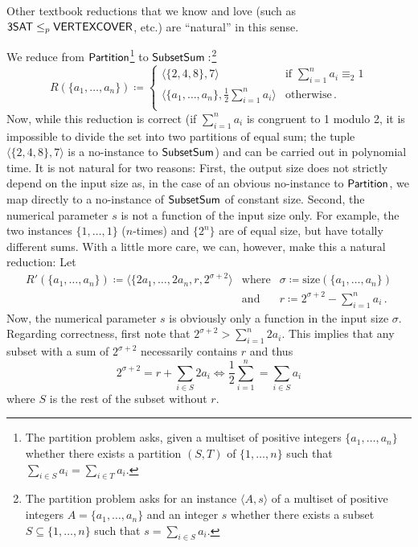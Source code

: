 \documentclass[11pt]{article}
\begin{document}
	Other textbook reductions that we know and love (such as $\mathsf{3SAT} \leq_p \mathsf{VERTEXCOVER}$, etc.) are ``natural'' in this sense.
%
%
\begin{example}
  We reduce from
  $\mathsf{Partition}$\footnote{The partition problem asks, given a multiset
  of positive integers $\{a_1, \dots, a_n\}$ whether there exists a partition
  $(S,T)$ of $\{1, \dots, n\}$ such that
  $\sum_{i \in S} a_i = \sum_{i \in T} a_i$.}
  to
  $\mathsf{SubsetSum}:$\footnote{The partition problem asks for an instance
  $\langle A, s \rangle$ of a multiset of positive integers
  $A = \{a_1, \dots, a_n\}$ and an integer $s$ whether there exists a subset
  $S \subseteq \{1, \dots, n\}$ such that
  $s = \sum_{i \in S} a_i$.}
  \[
    R(\{a_1, \dots, a_n\}) \coloneqq
    \left\{
      \begin{array}{ll}
        \langle \{2, 4, 8\}, 7 \rangle
          & \textrm{if } \sum_{i=1}^n a_i \equiv_2 1 \\
        \langle \{a_1, \dots, a_n\}, \frac 1 2 \sum_{i=1}^n a_i \rangle
          & \textrm{otherwise} \,. \\
      \end{array}
    \right.
  \]
  Now, while this reduction is correct (if $\sum_{i=1}^n a_i$ is congruent to 1
  modulo 2, it is impossible to divide the set into two partitions of equal sum;
  the tuple $\langle \{2, 4, 8\}, 7 \rangle$ is a no-instance to
  $\mathsf{SubsetSum}$) and can be carried out in polynomial time.
  It is not natural for two reasons:
  First, the output size does not strictly depend on the input size as, in the
  case of an obvious no-instance to $\mathsf{Partition}$, we map directly to a
  no-instance of $\mathsf{SubsetSum}$ of constant size.
  Second, the numerical parameter $s$ is not a function of the input
  size only. For example, the two instances $\{1, \dots, 1\}$ ($n$-times) and
  $\{2^n\}$ are of equal size, but have totally different sums.
  With a little more care, we can, however, make this a natural reduction: Let
  \[
    \begin{array}{rrl}
      R'(\{a_1, \dots, a_n\}) \coloneqq
        \langle \{2 a_1, \dots, 2 a_n, r,
         2^{\sigma+2} \rangle
      &\textrm{where}&
      \sigma \coloneqq \mathrm{size}(\{a_1, \dots, a_n\}) \\
      &\textrm{and}&
      r \coloneqq 2^{\sigma+2} - \sum_{i=1}^n a_i \,.
    \end{array}
  \]
  Now, the numerical parameter $s$ is obviously only a function in the input
  size $\sigma$. Regarding correctness, first note that
  $2^{\sigma+2} > \sum_{i=1}^n 2 a_i$. This implies that any subset with a sum
  of $2^{\sigma+2}$ necessarily contains $r$ and thus
  \[
    \textstyle
    2^{\sigma+2} = r + \sum_{i \in S} 2a_i
    \iff
    \frac 1 2 \sum_{i=1}^n = \sum_{i \in S} a_i
  \]
  where $S$ is the rest of the subset without $r$.
\end{example}
\end{document}
